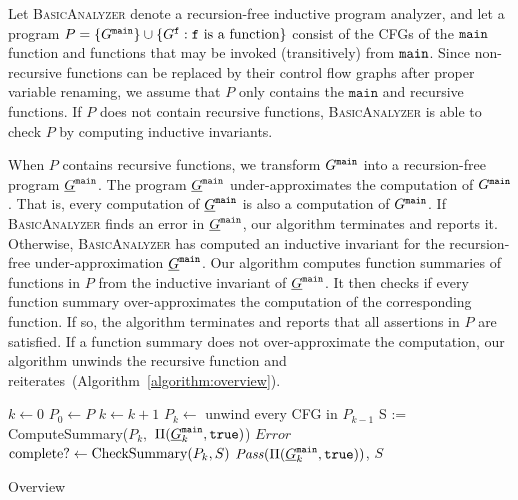 
Let \textsc{BasicAnalyzer} denote a recursion-free inductive program analyzer, and let a program $P=\{G^{\mathtt{{main}}}\}\cup\{G^{\mathtt{{f}}} : \mathtt{{f}}\mbox{ is a function}\}$ consist of the CFGs of the $\mathtt{{main}}$ function and functions that may be invoked (transitively) from $\mathtt{{main}}$.
Since non-recursive functions can be replaced by their control flow graphs
after proper variable renaming, we assume that $P$ only contains the
$\mathtt{main}$ and recursive functions. If $P$ does not contain
recursive functions, \textsc{BasicAnalyzer} is able to check $P$ by
computing inductive invariants.


When $P$ contains recursive functions, we transform $G^{\mathtt{{main}}}$ into a
recursion-free program $\underline{G}^{\mathtt{{main}}}$. The program $\underline{G}^{\mathtt{{main}}}$
under-approximates the computation of $G^{\mathtt{{main}}}$. That is, every computation
of $\underline{G}^{\mathtt{{main}}}$ is also a computation of $G^{\mathtt{{main}}}$. If
\textsc{BasicAnalyzer} finds an error in $\underline{G}^{\mathtt{{main}}}$, our
algorithm terminates and reports it. Otherwise,
\textsc{BasicAnalyzer} has computed an inductive invariant for the
recursion-free under-approximation $\underline{G}^{\mathtt{{main}}}$. Our algorithm
computes function summaries of functions in $P$ from the inductive invariant of
$\underline{G}^{\mathtt{{main}}}$. It then checks if every function summary
over-approximates the computation of the corresponding function. If
so, the algorithm terminates and reports that all assertions in $P$
are satisfied. If a function summary does not over-approximate the
computation, our algorithm unwinds the recursive function and
reiterates~(Algorithm~\ref{algorithm:overview}).

\begin{algorithm}[htb]

  $k \leftarrow 0$\;
  $P_0 \leftarrow P$\;
  {
    $k \leftarrow k + 1$\;
    $P_{k} \leftarrow $ unwind every CFG in $P_{k-1}$\;
    {
      {    
        S := ComputeSummary($P_k,$ $\Pi (\underline{G}^{\mathtt{{main}}}_k, \mathtt{true})$)
      }
      {
        \Return $\mathit{Error}$
      }
    }
    $\textmd{complete?} \leftarrow \textmd{CheckSummary} (P_k, S)$\;
  }
  \Return $\mathit{Pass} (\Pi (\underline{G}^{\mathtt{{main}}}_k, \mathtt{true}))$, $S$\;
  \caption{Overview}
  \label{algorithm:overview}
\end{algorithm} 
\vspace{-0.5cm}

